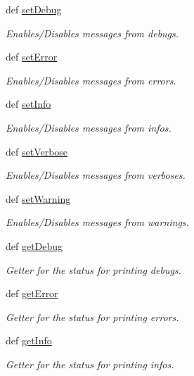 \begin{DoxyCompactItemize}
def \hyperlink{classlog_1_1_log_a1c0bae202e2ba2b76b9f1cab4d9059ba}{set\-Debug}
\begin{DoxyCompactList}\small\item\em Enables/\-Disables messages from debugs. \end{DoxyCompactList}\item 
def \hyperlink{classlog_1_1_log_aad0ceee375960468a4f063174ad442c8}{set\-Error}
\begin{DoxyCompactList}\small\item\em Enables/\-Disables messages from errors. \end{DoxyCompactList}\item 
def \hyperlink{classlog_1_1_log_adc7a72b199c39e4896fc34a253086f8d}{set\-Info}
\begin{DoxyCompactList}\small\item\em Enables/\-Disables messages from infos. \end{DoxyCompactList}\item 
def \hyperlink{classlog_1_1_log_a7922fb77d3180f794aa824caf3437b2c}{set\-Verbose}
\begin{DoxyCompactList}\small\item\em Enables/\-Disables messages from verboses. \end{DoxyCompactList}\item 
def \hyperlink{classlog_1_1_log_a575cce3f28f59eb8e79957340dd54eda}{set\-Warning}
\begin{DoxyCompactList}\small\item\em Enables/\-Disables messages from warnings. \end{DoxyCompactList}\item 
def \hyperlink{classlog_1_1_log_afd75165f95a4b9d54d0c7f27f0fcc9d7}{get\-Debug}
\begin{DoxyCompactList}\small\item\em Getter for the status for printing debugs. \end{DoxyCompactList}\item 
def \hyperlink{classlog_1_1_log_a723f2ac213ad68c7151bade1398ddad3}{get\-Error}
\begin{DoxyCompactList}\small\item\em Getter for the status for printing errors. \end{DoxyCompactList}\item 
def \hyperlink{classlog_1_1_log_a0ef8f7bcb3e9fd1de1ceee142746b982}{get\-Info}
\begin{DoxyCompactList}\small\item\em Getter for the status for printing infos. \end{DoxyCompactList}\item 

\end{DoxyCompactItemize}
